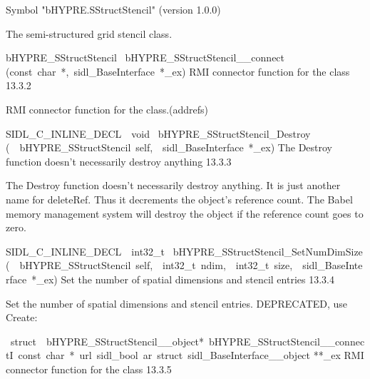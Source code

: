 \documentclass{article}
\begin{document}
\begin{cxxentry}
\begin{cxxentry}
\begin{cxxvariable}
\begin{cxxdoc}
Symbol "bHYPRE.SStructStencil" (version 1.0.0)

The semi-structured grid stencil class.
\end{cxxdoc}
\end{cxxvariable}
\begin{cxxfunction}
{bHYPRE\_SStructStencil\ }
        {bHYPRE\_SStructStencil\_\_connect}
        {(const\ char\ *,\ sidl\_BaseInterface\ *\_ex)}
        {
RMI connector function for the class}
        {13.3.2}
\begin{cxxdoc}

RMI connector function for the class.(addrefs)
\end{cxxdoc}
\end{cxxfunction}
\begin{cxxfunction}
{SIDL\_C\_INLINE\_DECL\ \ void\ }
        {bHYPRE\_SStructStencil\_Destroy}
        {(\ \ bHYPRE\_SStructStencil\ self,\ \ sidl\_BaseInterface\ *\_ex)}
        {
The Destroy function doesn't necessarily destroy anything}
        {13.3.3}
\begin{cxxdoc}

The Destroy function doesn't necessarily destroy anything.
It is just another name for deleteRef.  Thus it decrements the
object's reference count.  The Babel memory management system will
destroy the object if the reference count goes to zero.
\end{cxxdoc}
\end{cxxfunction}
\begin{cxxfunction}
{SIDL\_C\_INLINE\_DECL\ \ int32\_t\ }
        {bHYPRE\_SStructStencil\_SetNumDimSize}
        {(\ \ bHYPRE\_SStructStencil\ self,\ \ int32\_t\ ndim,\ \ int32\_t\ size,\ \ sidl\_BaseInterface\ *\_ex)}
        {
Set the number of spatial dimensions and stencil entries}
        {13.3.4}
\begin{cxxdoc}

Set the number of spatial dimensions and stencil entries.
DEPRECATED, use Create:
\end{cxxdoc}
\end{cxxfunction}
\begin{cxxvariable}
{\ struct\ \ bHYPRE\_SStructStencil\_\_object*\ bHYPRE\_SStructStencil\_\_connectI\ const\ char\ *\ url\ sidl\_bool\ ar\ struct\ sidl\_BaseInterface\_\_object}
        {**\_ex}
        {}
        {
RMI connector function for the class}
        {13.3.5}
\begin{cxxdoc}


\end{cxxdoc}
\end{cxxvariable}
\end{cxxentry}
\end{cxxentry}
\end{document}
